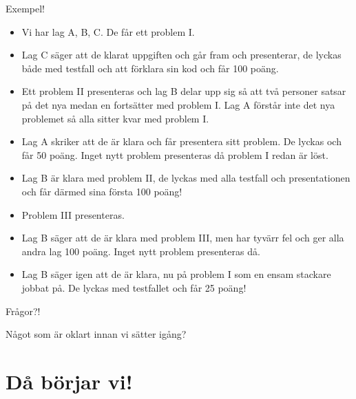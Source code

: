 \documentclass[10pt]{beamer}
\begin{document}
\begin{frame}[fragile]{Exempel!}

\begin{itemize}
\item Vi har lag A, B, C.  De får ett problem I. 
\item Lag C säger att de klarat uppgiften och går fram och presenterar, de lyckas både med testfall och att förklara sin kod och får 100 poäng. 
\item Ett problem II presenteras och lag B delar upp sig så att två personer satsar på det nya medan en fortsätter med problem I. Lag A förstår inte det nya problemet så alla sitter kvar med problem I. 
\item Lag A skriker att de är klara och får presentera sitt problem. De lyckas och får 50 poäng. Inget nytt problem presenteras då problem I redan är löst.
\item Lag B är klara med problem II, de lyckas med alla testfall och presentationen och får därmed sina första 100 poäng! 
\item Problem III presenteras.
\item Lag B säger att de är klara med problem III, men har tyvärr fel och ger alla andra lag 100 poäng. Inget nytt problem presenteras då. 
\item Lag B säger igen att de är klara, nu på problem I som en ensam stackare jobbat på. De lyckas med testfallet och får 25 poäng! 
\end{itemize}
\end{frame}





\begin{frame}[fragile]{Frågor?!}

Något som är oklart innan vi sätter igång? 

\end{frame}




\section{Då börjar vi!}
\end{document}
